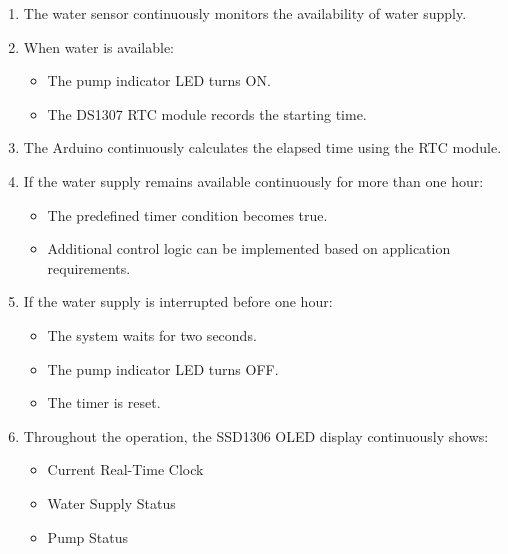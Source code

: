 \begin{enumerate}

\item The water sensor continuously monitors the availability of water supply.

\item When water is available:

\begin{itemize}
    \item The pump indicator LED turns ON.
    \item The DS1307 RTC module records the starting time.
\end{itemize}

\item The Arduino continuously calculates the elapsed time using the RTC module.

\item If the water supply remains available continuously for more than one hour:

\begin{itemize}
    \item The predefined timer condition becomes true.
    \item Additional control logic can be implemented based on application requirements.
\end{itemize}

\item If the water supply is interrupted before one hour:

\begin{itemize}
    \item The system waits for two seconds.
    \item The pump indicator LED turns OFF.
    \item The timer is reset.
\end{itemize}

\item Throughout the operation, the SSD1306 OLED display continuously shows:

\begin{itemize}
    \item Current Real-Time Clock
    \item Water Supply Status
    \item Pump Status
\end{itemize}

\end{enumerate}




